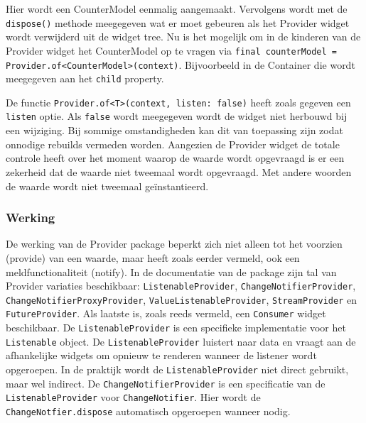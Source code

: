 Hier wordt een CounterModel eenmalig aangemaakt. Vervolgens wordt met de \verb|dispose()| methode meegegeven wat er moet gebeuren als het Provider widget wordt verwijderd uit de widget tree. Nu is het mogelijk om in de kinderen van de Provider widget het CounterModel op te vragen via \verb|final counterModel = Provider.of<CounterModel>(context)|.
Bijvoorbeeld in de Container die wordt meegegeven aan het \verb|child| property.

De functie \verb|Provider.of<T>(context, listen: false)| heeft zoals gegeven een \verb|listen| optie. Als \verb|false| wordt meegegeven wordt de widget niet herbouwd bij een wijziging. Bij sommige omstandigheden kan dit van toepassing zijn zodat onnodige rebuilds vermeden worden. Aangezien de Provider widget de totale controle heeft over het moment waarop de waarde wordt opgevraagd is er een zekerheid dat de waarde niet tweemaal wordt opgevraagd. Met andere woorden de waarde wordt niet tweemaal geïnstantieerd.

\subsubsection{Werking}
De werking van de Provider package beperkt zich niet alleen tot het voorzien (provide) van een waarde, maar heeft zoals eerder vermeld, ook een meldfunctionaliteit (notify).
In de documentatie van de package zijn tal van Provider variaties beschikbaar: \verb|ListenableProvider|, \verb|ChangeNotifierProvider|, \verb|ChangeNotifierProxyProvider|, \verb|ValueListenableProvider|, \verb|StreamProvider| en \verb|FutureProvider|. Als laatste is, zoals reeds vermeld, een \verb|Consumer| widget beschikbaar.
De \verb|ListenableProvider| is een specifieke implementatie voor het \verb|Listenable| object. De \verb|ListenableProvider| luistert naar data en vraagt aan de afhankelijke widgets om opnieuw te renderen wanneer de listener wordt opgeroepen. In de praktijk wordt de \verb|ListenableProvider| niet direct gebruikt, maar wel indirect. De \verb|ChangeNotifierProvider| is een specificatie van de \verb|ListenableProvider| voor \verb|ChangeNotifier|. Hier wordt de \verb|ChangeNotfier.dispose| automatisch opgeroepen wanneer nodig.

